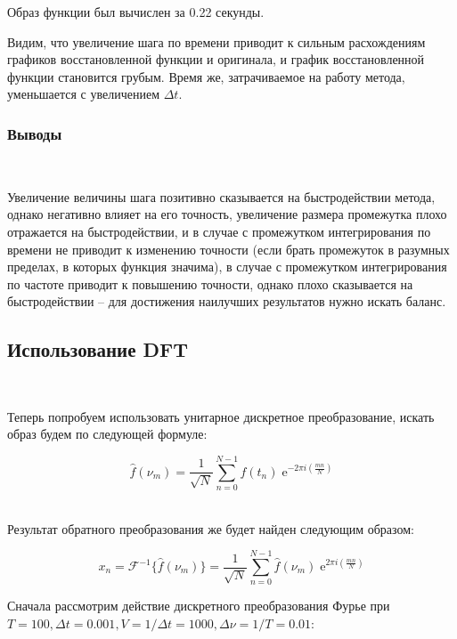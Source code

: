 \documentclass[a4paper]{article}
\newcommand{\e}{\;\text{e}}
\begin{document}
Образ функции был вычислен за 0.22 секунды. 

Видим, что увеличение шага по времени приводит к сильным расхождениям графиков восстановленной функции и оригинала, и график восстановленной функции становится грубым. Время же, затрачиваемое на работу метода, уменьшается с увеличением $\Delta t$.

\subsubsection{Выводы}\

Увеличение величины шага позитивно сказывается на быстродействии метода, однако негативно влияет на его точность, увеличение размера промежутка плохо отражается на быстродействии, и в случае с промежутком интегрирования по времени не приводит к изменению точности (если брать промежуток в разумных пределах, в которых функция значима), в случае с промежутком интегрирования по частоте приводит к повышению точности, однако плохо сказывается на быстродействии -- для достижения наилучших результатов нужно искать баланс.

\subsection{Использование DFT}\

Теперь попробуем использовать унитарное дискретное преобразование, искать образ будем по следующей формуле: 

$$
\hat{f}(\nu_m) = \frac{1}{\sqrt{N}} \sum_{n=0}^{N-1} f(t_n) \e^{-2\pi i (\frac{mn}{N})}
$$\

Результат обратного преобразования же будет найден следующим образом:

$$
x_n = \mathcal{F}^{-1}\{\hat{f}(\nu_m)\} = \frac{1}{\sqrt{N}} \sum_{n=0}^{N-1} \hat{f}(\nu_m) \e^{2\pi i (\frac{mn}{N})}
$$

Сначала рассмотрим действие дискретного преобразования Фурье при $T = 100, \Delta t = 0.001, V = 1/\Delta t = 1000, \Delta \nu = 1/T = 0.01$:
\end{document}
